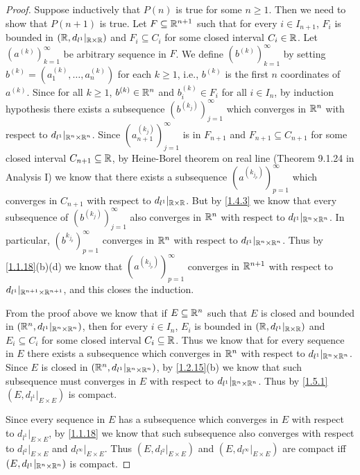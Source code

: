 \begin{proof}
  Suppose inductively that \(P(n)\) is true for some \(n \geq 1\).
  Then we need to show that \(P(n + 1)\) is true.
  Let \(F \subseteq \mathbb{R}^{n + 1}\) such that for every \(i \in I_{n + 1}\), \(F_i\) is bounded in \((\mathbb{R}, d_{l^1}|_{\mathbb{R} \times \mathbb{R}})\) and \(F_i \subseteq C_i\) for some closed interval \(C_i \in \mathbb{R}\).
  Let \((a^{(k)})_{k = 1}^\infty\) be arbitrary sequence in \(F\).
  We define \((b^{(k)})_{k = 1}^\infty\) by setting \(b^{(k)} = (a_1^{(k)}, \dots, a_n^{(k)})\) for each \(k \geq 1\), i.e., \(b^{(k)}\) is the first \(n\) coordinates of \(a^{(k)}\).
  Since for all \(k \geq 1\), \(b^{(k)} \in \mathbb{R}^n\) and \(b_i^{(k)} \in F_i\) for all \(i \in I_n\), by induction hypothesis there exists a subsequence \((b^{(k_j)})_{j = 1}^\infty\) which converges in \(\mathbb{R}^n\) with respect to \(d_{l^1}|_{\mathbb{R}^n \times \mathbb{R}^n}\).
  Since \((a_{n + 1}^{(k_j)})_{j = 1}^\infty\) is in \(F_{n + 1}\) and \(F_{n + 1} \subseteq C_{n + 1}\) for some closed interval \(C_{n + 1} \subseteq \mathbb{R}\), by Heine-Borel theorem on real line (Theorem 9.1.24 in Analysis I) we know that there exists a subsequence \((a^{(k_{j_p})})_{p = 1}^\infty\) which converges in \(C_{n + 1}\) with respect to \(d_{l^1}|_{\mathbb{R} \times \mathbb{R}}\).
  But by \cref{1.4.3} we know that every subsequence of \((b^{(k_j)})_{j = 1}^\infty\) also converges in \(\mathbb{R}^n\) with respect to \(d_{l^1}|_{\mathbb{R}^n \times \mathbb{R}^n}\).
  In particular, \((b^{k_{j_p}})_{p = 1}^\infty\) converges in \(\mathbb{R}^n\) with respect to \(d_{l^1}|_{\mathbb{R}^n \times \mathbb{R}^n}\).
  Thus by \cref{1.1.18}(b)(d) we know that \((a^{(k_{j_p})})_{p = 1}^\infty\) converges in \(\mathbb{R}^{n + 1}\) with respect to \(d_{l^1}|_{\mathbb{R}^{n + 1} \times \mathbb{R}^{n + 1}}\), and this closes the induction.

  From the proof above we know that if \(E \subseteq \mathbb{R}^n\) such that \(E\) is closed and bounded in \((\mathbb{R}^n, d_{l^1}|_{\mathbb{R}^n \times \mathbb{R}^n})\), then for every \(i \in I_n\), \(E_i\) is bounded in \((\mathbb{R}, d_{l^1}|_{\mathbb{R} \times \mathbb{R}})\) and \(E_i \subseteq C_i\) for some closed interval \(C_i \subseteq \mathbb{R}\).
  Thus we know that for every sequence in \(E\) there exists a subsequence which converges in \(\mathbb{R}^n\) with respect to \(d_{l^1}|_{\mathbb{R}^n \times \mathbb{R}^n}\).
  Since \(E\) is closed in \((\mathbb{R}^n, d_{l^1}|_{\mathbb{R}^n \times \mathbb{R}^n})\), by \cref{1.2.15}(b) we know that such subsequence must converges in \(E\) with respect to \(d_{l^1}|_{\mathbb{R}^n \times \mathbb{R}^n}\).
  Thus by \cref{1.5.1} \((E, d_{l^1}|_{E \times E})\) is compact.

  Since every sequence in \(E\) has a subsequence which converges in \(E\) with respect to \(d_{l^1}|_{E \times E}\), by \cref{1.1.18} we know that such subsequence also converges with respect to \(d_{l^2}|_{E \times E}\) and \(d_{l^\infty}|_{E \times E}\).
  Thus \((E, d_{l^2}|_{E \times E})\) and \((E, d_{l^\infty}|_{E \times E})\) are compact iff \((E, d_{l^1}|_{\mathbb{R}^n \times \mathbb{R}^n})\) is compact.
\end{proof}

